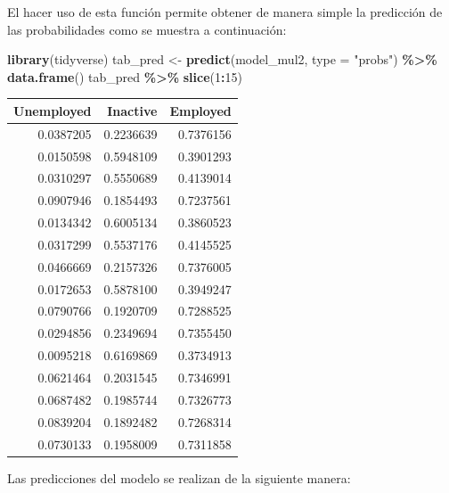 \documentclass[
  12pt,
]{book}
\newenvironment{Shaded}{\begin{snugshade}}{\end{snugshade}}
\newcommand{\AttributeTok}[1]{\textcolor[rgb]{0.13,0.29,0.53}{#1}}
\newcommand{\DecValTok}[1]{\textcolor[rgb]{0.00,0.00,0.81}{#1}}
\newcommand{\FunctionTok}[1]{\textcolor[rgb]{0.13,0.29,0.53}{\textbf{#1}}}
\newcommand{\NormalTok}[1]{#1}
\newcommand{\OtherTok}[1]{\textcolor[rgb]{0.56,0.35,0.01}{#1}}
\newcommand{\SpecialCharTok}[1]{\textcolor[rgb]{0.81,0.36,0.00}{\textbf{#1}}}
\newcommand{\StringTok}[1]{\textcolor[rgb]{0.31,0.60,0.02}{#1}}
\begin{document}
El hacer uso de esta función permite obtener de manera simple la predicción de las probabilidades como se muestra a continuación:

\begin{Shaded}
\begin{Highlighting}[]
\FunctionTok{library}\NormalTok{(tidyverse)}
\NormalTok{tab\_pred }\OtherTok{\textless{}{-}} \FunctionTok{predict}\NormalTok{(model\_mul2, }\AttributeTok{type =} \StringTok{"probs"}\NormalTok{) }\SpecialCharTok{\%\textgreater{}\%} 
  \FunctionTok{data.frame}\NormalTok{()}
\NormalTok{tab\_pred }\SpecialCharTok{\%\textgreater{}\%} \FunctionTok{slice}\NormalTok{(}\DecValTok{1}\SpecialCharTok{:}\DecValTok{15}\NormalTok{)}
\end{Highlighting}
\end{Shaded}

\begin{tabular}{r|r|r}
\hline
Unemployed & Inactive & Employed\\
\hline
0.0387205 & 0.2236639 & 0.7376156\\
\hline
0.0150598 & 0.5948109 & 0.3901293\\
\hline
0.0310297 & 0.5550689 & 0.4139014\\
\hline
0.0907946 & 0.1854493 & 0.7237561\\
\hline
0.0134342 & 0.6005134 & 0.3860523\\
\hline
0.0317299 & 0.5537176 & 0.4145525\\
\hline
0.0466669 & 0.2157326 & 0.7376005\\
\hline
0.0172653 & 0.5878100 & 0.3949247\\
\hline
0.0790766 & 0.1920709 & 0.7288525\\
\hline
0.0294856 & 0.2349694 & 0.7355450\\
\hline
0.0095218 & 0.6169869 & 0.3734913\\
\hline
0.0621464 & 0.2031545 & 0.7346991\\
\hline
0.0687482 & 0.1985744 & 0.7326773\\
\hline
0.0839204 & 0.1892482 & 0.7268314\\
\hline
0.0730133 & 0.1958009 & 0.7311858\\
\hline
\end{tabular}

Las predicciones del modelo se realizan de la siguiente manera:

\begin{Shaded}
\end{Shaded}
\end{document}

